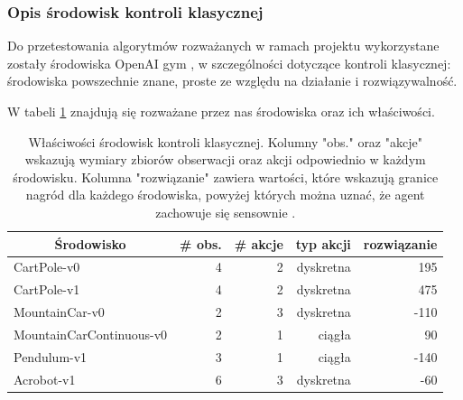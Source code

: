 \documentclass[12pt,a4paper]{article}
\begin{document}
\subsubsection{Opis środowisk kontroli klasycznej}

Do przetestowania algorytmów rozważanych w ramach projektu wykorzystane
zostały środowiska OpenAI gym \cite{openai_gym}, w szczególności dotyczące
kontroli klasycznej: środowiska powszechnie znane, proste ze względu
na działanie i rozwiązywalność.

W tabeli \ref{table:env_properties} znajdują się rozważane przez nas
środowiska oraz ich właściwości.


\begin{table}[!h]
  \begin{tabular}{lrrrr}
    \hline
    \multicolumn{1}{c}{Środowisko} & \multicolumn{1}{c}{\# obs.} & \multicolumn{1}{c}{\# akcje} & \multicolumn{1}{c}{typ akcji} & \multicolumn{1}{c}{rozwiązanie} \\
    \hline
    CartPole-v0                    & 4                           & 2                            & dyskretna                     & 195                             \\
    CartPole-v1                    & 4                           & 2                            & dyskretna                     & 475                             \\
    MountainCar-v0                 & 2                           & 3                            & dyskretna                     & -110                            \\
    MountainCarContinuous-v0       & 2                           & 1                            & ciągła                        & 90                              \\
    Pendulum-v1                    & 3                           & 1                            & ciągła                        & -140                            \\
    Acrobot-v1                     & 6                           & 3                            & dyskretna                     & -60                             \\
    \hline
  \end{tabular}
  \caption{
    Właściwości środowisk kontroli klasycznej. Kolumny "obs." oraz "akcje"
    wskazują wymiary zbiorów obserwacji oraz akcji odpowiednio w każdym środowisku.
    Kolumna "rozwiązanie" zawiera wartości, które wskazują granice
    nagród dla każdego środowiska, powyżej których można uznać, że agent
    zachowuje się sensownie \cite{analyzing_reinforcement} \cite{openai_gym}.
  }\label{table:env_properties}
\end{table}
\end{document}
